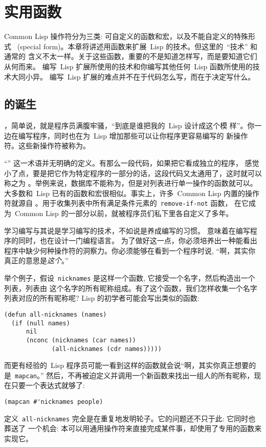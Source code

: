 
\chapter{实用函数}
\label{chap:utility_functions}

Common Lisp 操作符分为三类: 可自定义的函数和宏，以及不能自定义的特殊形式
~(special form)。本章将讲述用函数来扩展~Lisp 的技术。但这里的~``技术'' 和通常的
含义不太一样。关于这些函数，重要的不是知道怎样写，而是要知道它们从何而来。
编写~Lisp 扩展所使用的技术和你编写其他任何~Lisp 函数所使用的技术大同小异。
编写~Lisp 扩展的难点并不在于代码怎么写，而在于决定写什么。

\section{\utility{}的诞生}
\label{sec:birth_of_a_utility}

\bup{}，简单说，就是程序员满腹牢骚，``到底是谁把我的~Lisp 设计成这个模
样''。你一边在编写程序，同时也在为~Lisp 增加那些可以让你程序更容易编写的
新操作符。这些新操作符被称为\emph{\utility{}}。

``\utility{}'' 这一术语并无明确的定义。有那么一段代码，如果把它看成独立的程序，
感觉小了点，要是把它作为特定程序的一部分的话，这段代码又太通用了，这时就可以称之为
\utility{}。举例来说，数据库不能称为\utility{}，但是对列表进行单一操作的函数就可以。
大多数\utility{}和~Lisp 已有的函数和宏很相似。事实上，许多~Common Lisp 内置的操作符就源自
\utility{}。用于收集列表中所有满足条件元素的~\texttt{remove-if-not} 函数，
在它成为~Common Lisp 的一部分以前，就被程序员们私下里各自定义了多年。

学习编写\utility{}与其说是学习编写的技术，不如说是养成编写\utility{}的习惯。
\bup{}意味着在编写程序的同时，也在设计一门编程语言。
为了做好这一点，你必须培养出一种能看出程序中缺少何种操作符的洞察力。你必须能够在看到一个程序时说,
``啊，其实你真正的意思是\emph{这个}。''

举个例子\label{page:nicknames}，假设~\texttt{nicknames} 是这样一个函数,
它接受一个名字，然后构造出一个列表，列表由
这个名字的所有昵称组成。有了这个函数，我们怎样收集一个名字列表对应的所有昵称呢?
Lisp 的初学者可能会写出类似的函数:
\begin{lstlisting}
(defun all-nicknames (names)
  (if (null names)
      nil
      (nconc (nicknames (car names))
             (all-nicknames (cdr names)))))
\end{lstlisting}
而更有经验的~Lisp 程序员可能一看到这样的函数就会说``啊，其实你真正想要的是~\texttt{mapcan}。''
然后，不再被迫定义并调用一个新函数来找出一组人的所有昵称，现在只要一个表达式就够了:
\begin{lstlisting}
(mapcan #'nicknames people)
\end{lstlisting}
定义~\texttt{all-nicknames} 完全是在重复地发明轮子。它的问题还不只于此: 它同时也葬送了
一个机会: 本可以用通用操作符来直接完成某件事，却使用了专用的函数来实现它。

